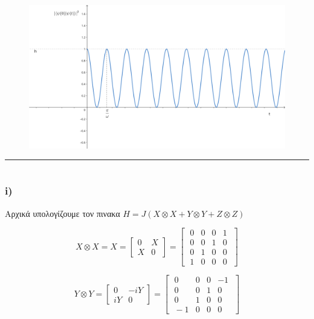 \documentclass[12pt]{article}
\begin{document}
\begin{figure}[H]

    \centering
    \includegraphics[scale = 0.4]{geogebra-export.png}\\ 
\end{figure}
\rule{\textwidth}{.5pt}
\section*{{}}
\subsubsection*{\textlatin{\bf i)}}
Αρχικά υπολογίζουμε τον πινακα $H= J(X\otimes X+Y\otimes Y +Z\otimes Z)$


$$X\otimes X = X =\begin{bmatrix}
    0 & X \\ 
    X & 0
\end{bmatrix}= \begin{bmatrix}
    \;0 & 0& 0& 1 \;\\ 
    \;0 & 0& 1& 0\;\\
    \;0 & 1& 0& 0\;\\
    \;1 & 0& 0& 0\;
\end{bmatrix}$$

$$Y\otimes Y  =\begin{bmatrix}
    0 & -iY \\ 
    iY & 0
\end{bmatrix}= \begin{bmatrix}
    \;0 & 0& 0& -1 \;\\ 
    \;0 & 0& 1& 0\;\\
    \;0 & 1& 0& 0\;\\
    \;-1 & 0& 0& 0\;
\end{bmatrix}$$
\end{document}
